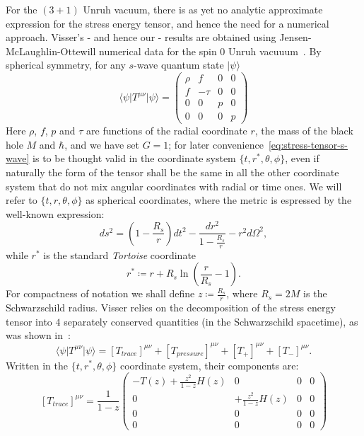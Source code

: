 For the \((3 + 1)\) Unruh vacuum, there is as yet no analytic approximate expression for the stress energy tensor, and hence the need for a numerical approach. Visser's - and hence our - results are obtained using Jensen-McLaughlin-Ottewill numerical data for the spin \(0\) Unruh vacuuum~\cite[]{jensen1991renormalized}. By spherical symmetry, for any \(s\)-wave quantum state \(\vert \psi\rangle\) 
\begin{equation}
    \label{eq:stress-tensor-s-wave}
    \langle\psi\vert T^{\mu\nu}\vert\psi\rangle = \begin{pmatrix}
        \rho & f & 0 & 0 \\
        f & -\tau & 0 & 0 \\
        0 & 0 & p & 0 \\
        0 & 0 & 0 & p
    \end{pmatrix}
\end{equation}
Here \(\rho\), \(f\), \(p\) and  \(\tau\) are functions of the radial coordinate \(r\), the mass of the black hole \(M\) and \(\hbar\), and we have set \(G = 1\); for later convenience~\eqref{eq:stress-tensor-s-wave} is to be thought valid in the coordinate system \(\{t, r^*, \theta, \phi\}\), even if naturally the form of the tensor shall be the same in all the other coordinate system that do not mix angular coordinates with radial or time ones. We will refer to \(\{t, r, \theta, \phi\}\) as spherical coordinates, where the metric is espressed by the well-known expression:
\[
ds^2 =  \left(1 - \frac{R_s}{r}\right)dt^2  - \frac{dr^2}{1 - \frac{R_s}{r}} - r^2d\Omega^2,
\]
while \(r^*\) is the standard \emph{Tortoise} coordinate
\[
r^* \coloneqq r + R_s\ln\left(\frac{r}{R_s} - 1\right).    
\]
For compactness of notation we shall define \(z \coloneqq \frac{R_s}{r}\), where \(R_s = 2M\) is the Schwarzschild radius.
Visser relies on the decomposition of the stress energy tensor into \(4\) separately conserved quantities (in the Schwarzschild spacetime), as was shown in~\cite[]{christensen1977trace}: 
\[
    \langle\psi\vert T^{\mu\nu}\vert\psi\rangle = \left[T_{trace}\right]^{\mu\nu} + \left[T_{pressure}\right]^{\mu\nu} +
    \left[T_{+}\right]^{\mu\nu} + \left[T_{-}\right]^{\mu\nu}.
\]
Written in the \(\{t, r^*, \theta, \phi\}\) coordinate system, their components are:
\[
    \left[T_{trace}\right]^{\mu\nu} = \frac{1}{1 - z}\begin{pmatrix}
        -T(z) + \frac{z^2}{1 - z}H(z) & 0 & 0 & 0 \\
        0 & + \frac{z^2}{1 - z}H(z) & 0 & 0 \\
        0 & 0 & 0 & 0 \\
        0 & 0 & 0 & 0
    \end{pmatrix} 
\]
